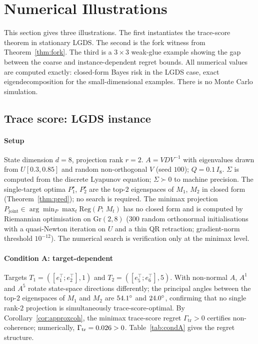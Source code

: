 \documentclass[final,3p,times]{elsarticle}
\newcommand{\Gr}{\mathrm{Gr}}
\newcommand{\Reg}{\mathrm{Reg}}
\begin{document}
\section{Numerical Illustrations}
\label{sec:numerics}

This section gives three illustrations.
The first instantiates the trace-score theorem in stationary LGDS.
The second is the fork witness from Theorem~\ref{thm:fork}.
The third is a $3\times 3$ weak-glue example showing the gap between the
coarse and instance-dependent regret bounds.
All numerical values are computed exactly: closed-form Bayes risk in the
LGDS case, exact eigendecomposition for the small-dimensional examples.
There is no Monte Carlo simulation.

\subsection{Trace score: LGDS instance}

\paragraph{Setup}
State dimension $d=8$, projection rank $r=2$.
$A=VDV^{-1}$ with eigenvalues drawn from $U[0.3,0.85]$ and random
non-orthogonal $V$ (seed $100$); $Q=0.1\,I_8$.
$\Sigma$ is computed from the discrete Lyapunov equation; $\Sigma\succ 0$
to machine precision.
The single-target optima $P_1^\star$, $P_2^\star$ are the top-$2$
eigenspaces of $M_1$, $M_2$ in closed form (Theorem~\ref{thm:pred});
no search is required.
The minimax projection $P_{\mathrm{joint}}\in\arg\min_{P}\max_t
\Reg(P;\,M_t)$ has no closed form and is computed by Riemannian
optimisation on $\Gr(2,8)$ ($300$ random orthonormal initialisations with
a quasi-Newton iteration on $U$ and a thin QR retraction; gradient-norm
threshold $10^{-12}$).
The numerical search is verification only at the minimax level.

\paragraph{Condition A: target-dependent}
Targets $T_1=([e_1^\top;e_2^\top],1)$ and $T_2=([e_5^\top;e_6^\top],5)$.
With non-normal $A$, $A^1$ and $A^5$ rotate state-space directions
differently; the principal angles between the top-$2$ eigenspaces of
$M_1$ and $M_2$ are $54.1^\circ$ and $24.0^\circ$,
confirming that no single rank-$2$ projection is simultaneously
trace-score-optimal.
By Corollary~\ref{cor:approxcoh}, the minimax trace-score regret
$\Gamma_{\mathrm{tr}}>0$ certifies non-coherence; numerically,
$\Gamma_{\mathrm{tr}}=0.026>0$.
Table~\ref{tab:condA} gives the regret structure.
\end{document}
